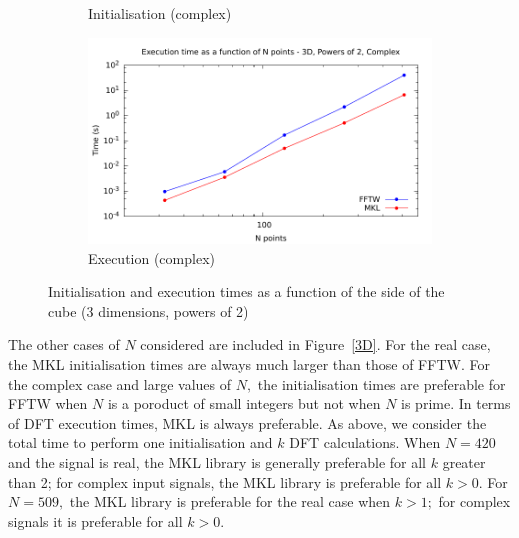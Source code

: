 \documentclass[12pt, a4paper]{article} \setlength{\textheight}{24cm}
\begin{document}
\begin{figure}[H]
\begin{subfigure}{.5\textwidth}
    \caption{Initialisation (complex)}
    \label{3DPOW2CI}
  \end{subfigure}%
  \begin{subfigure}{.5\textwidth}
    \centering
    \includegraphics[width=.9\linewidth]{graphs/3d-pow2-exec-c.pdf}
    \caption{Execution (complex)}
    \label{3DPOW2C}
  \end{subfigure}
  \caption{Initialisation and execution times as a function of the
    side of the cube (3 dimensions, powers of 2)}
  \label{3DPOW2}
\end{figure}

The other cases of $N$ considered are included in Figure~\ref{3D}. For the real case, the MKL initialisation times are always much larger than those of FFTW. For the complex case and large values of $N,$ the initialisation times are preferable for FFTW when $N$ is a poroduct of small integers but not when $N$ is prime. In terms of DFT execution times, MKL is always preferable. As above, we consider the total time to perform one initialisation and $k$ DFT calculations. When $N=420$ and the signal is real, the MKL library is generally preferable for all $k$ greater than 2; for complex input signals, the MKL library is preferable for all $k>0.$ For $N=509,$ the MKL library is preferable for the real case when $k>1;$ for complex signals it is preferable for all $k>0.$ 
\end{document}
